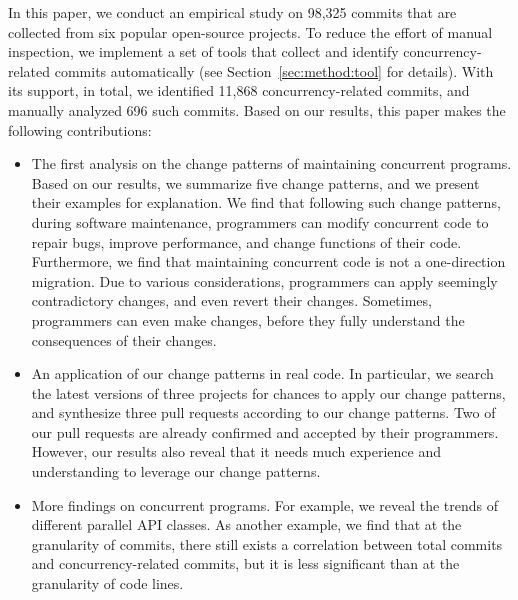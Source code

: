 In this paper, we conduct an empirical study on 98,325 commits that are collected from six popular open-source projects. To reduce the effort of manual inspection, we implement a set of tools that collect and identify concurrency-related commits automatically (see Section~\ref{sec:method:tool} for details). With its support, in total, we identified 11,868 concurrency-related commits, and manually analyzed 696 such commits. Based on our results, this paper makes the following contributions:

\begin{itemize}
	\item The first analysis on the change patterns of maintaining concurrent programs. Based on our results, we summarize five change patterns, and we present their examples for explanation. We find that following such change patterns, during software maintenance, programmers can modify concurrent code to repair bugs, improve performance, and change functions of their code. Furthermore, we find that maintaining concurrent code is not a one-direction migration. Due to various considerations, programmers can apply seemingly contradictory changes, and even revert their changes. Sometimes, programmers can even make changes, before they fully understand the consequences of their changes.
	\item An application of our change patterns in real code. In particular, we search the latest versions of three projects for chances to apply our change patterns, and synthesize three pull requests according to our change patterns. Two of our pull requests are already confirmed and accepted by their programmers. However, our results also reveal that it needs much experience and understanding to leverage our change patterns.
	\item More findings on concurrent programs. For example, we reveal the trends of different parallel API classes. As another example, we find that at the granularity of commits, there still exists a correlation between total commits and concurrency-related commits, but it is less significant than at the granularity of code lines.
\end{itemize}

